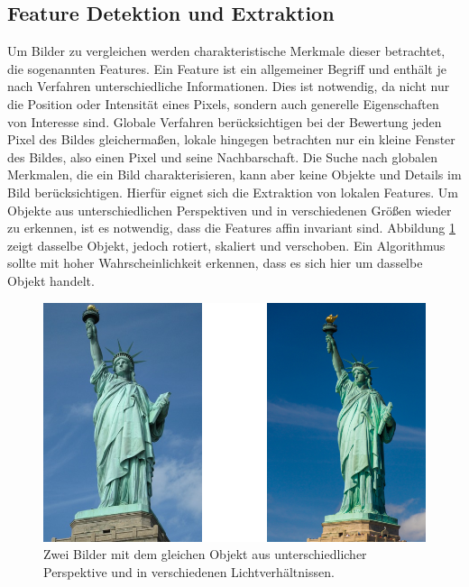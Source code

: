 \subsection{Feature Detektion und Extraktion}

Um Bilder zu vergleichen werden charakteristische Merkmale dieser betrachtet, die sogenannten Features. Ein Feature ist ein allgemeiner Begriff und enthält je nach Verfahren unterschiedliche Informationen. Dies ist notwendig, da nicht nur die Position oder Intensität eines Pixels, sondern auch generelle Eigenschaften von Interesse sind. Globale Verfahren berücksichtigen bei der Bewertung jeden Pixel des Bildes gleichermaßen, lokale hingegen betrachten nur ein kleine Fenster des Bildes, also einen Pixel und seine Nachbarschaft. Die Suche nach globalen Merkmalen, die ein Bild charakterisieren, kann aber keine Objekte und Details im Bild berücksichtigen. Hierfür eignet sich die Extraktion von lokalen Features. Um Objekte aus unterschiedlichen Perspektiven und in verschiedenen Größen wieder zu erkennen, ist es notwendig, dass die Features affin invariant sind. Abbildung \ref{img:liberty} zeigt dasselbe Objekt, jedoch rotiert, skaliert und verschoben. Ein Algorithmus sollte mit hoher Wahrscheinlichkeit erkennen, dass es sich hier um dasselbe Objekt handelt.

\begin{figure}
	\centering
	\includegraphics[scale=0.55]{images/liberty.png}
	\caption{Zwei Bilder mit dem gleichen Objekt aus unterschiedlicher Perspektive und in verschiedenen Lichtverhältnissen.}
	\label{img:liberty}
\end{figure}


